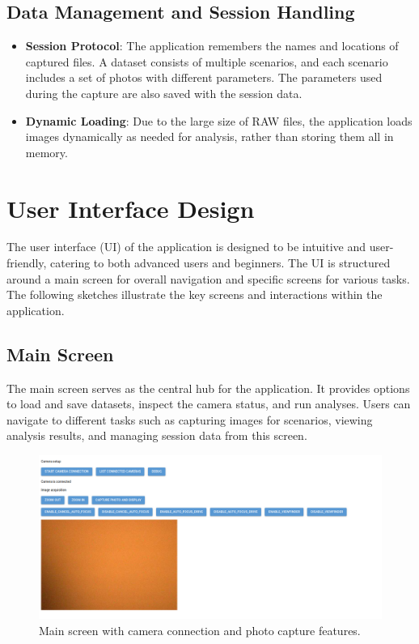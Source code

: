 \subsection{Data Management and Session Handling}
\begin{itemize}
    \item \textbf{Session Protocol}: The application remembers the names and locations of captured files. A dataset consists of multiple scenarios, and each scenario includes a set of photos with different parameters. The parameters used during the capture are also saved with the session data.
    \item \textbf{Dynamic Loading}: Due to the large size of RAW files, the application loads images dynamically as needed for analysis, rather than storing them all in memory.
\end{itemize}

\section{User Interface Design}

The user interface (UI) of the application is designed to be intuitive and user-friendly, catering to both advanced users and beginners. The UI is structured around a main screen for overall navigation and specific screens for various tasks. The following sketches illustrate the key screens and interactions within the application.

\subsection{Main Screen}

The main screen serves as the central hub for the application. It provides options to load and save datasets, inspect the camera status, and run analyses. Users can navigate to different tasks such as capturing images for scenarios, viewing analysis results, and managing session data from this screen.

\begin{figure}[h]
\centering
\includegraphics[width=1\textwidth]{Images/ui1.png}
\caption{Main screen with camera connection and photo capture features.}
\label{fig:ui_main_screen}
\end{figure}

